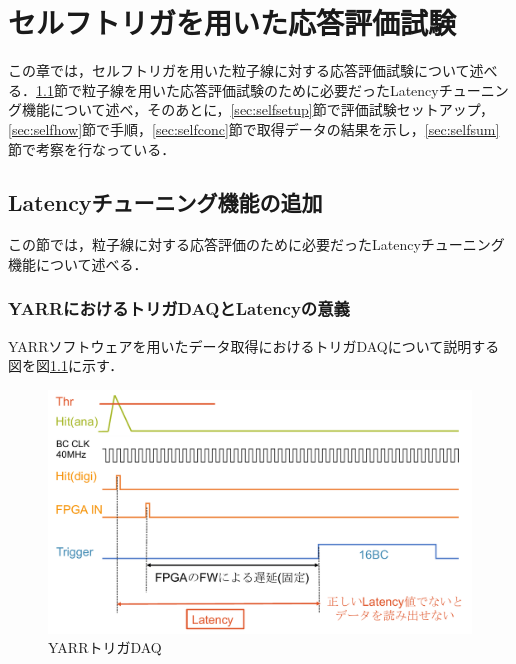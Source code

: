 \chapter{セルフトリガを用いた応答評価試験}
この章では，セルフトリガを用いた粒子線に対する応答評価試験について述べる．\ref{sec:latency}節で粒子線を用いた応答評価試験のために必要だったLatencyチューニング機能について述べ，そのあとに，\ref{sec:selfsetup}節で評価試験セットアップ，\ref{sec:selfhow}節で手順，\ref{sec:selfconc}節で取得データの結果を示し，\ref{sec:selfsum}節で考察を行なっている．

\section{Latencyチューニング機能の追加}
\label{sec:latency}
この節では，粒子線に対する応答評価のために必要だったLatencyチューニング機能について述べる．
\subsection{YARRにおけるトリガDAQとLatencyの意義}
YARRソフトウェアを用いたデータ取得におけるトリガDAQについて説明する図を図\ref{fig:YARRDAQ}に示す．\par
\begin{figure}[h]
  \centering
  \includegraphics[width=13cm]{./figure/DAQ_signal.pdf}
  \caption{YARRトリガDAQ}
  \label{fig:YARRDAQ}
\end{figure}

